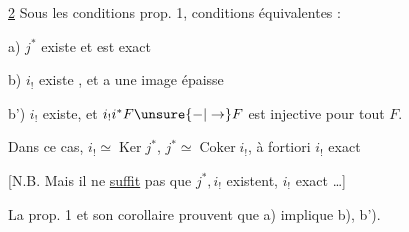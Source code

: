


\uline{  2} Sous les conditions  prop. 1, conditions équivalentes :

a) $j^*$ existe  et est exact

b) $i_!$ existe , et a une image  épaisse

b') $i_!$ existe, et $i_!i^*F\unsure{-|\to}F$ est injective pour tout $F$.

Dans ce cas, $i_!\simeq\operatorname{Ker}j^*$, $j^*\simeq\operatorname{Coker}i_!$, à fortiori $i_!$ exact

[N.B. Mais il ne \uline{suffit} pas que $j^*,i_!$ existent, $i_!$ exact \ldots]

La prop. 1 et son corollaire prouvent que a) implique b), b').

